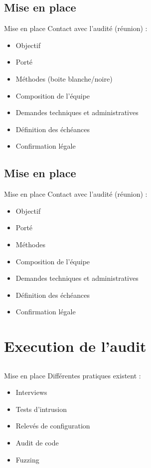 \documentclass{beamer}
\newcommand{\colorized}[1]{{\color{red}{#1}}}
\begin{document}
	\subsection{Mise en place}
	\begin{frame}{Mise en place}
	     Contact avec l'audité (réunion) : 
		\begin{itemize}
			\item Objectif
			\item Porté
			\item Méthodes (boite blanche/noire)
			\item Composition de l'équipe
			\item Demandes techniques et administratives
			\item Définition des échéances
			\item Confirmation légale
		\end{itemize}		
	\end{frame}

	\subsection{Mise en place}
		\begin{frame}{Mise en place}
		Contact avec l'audité (réunion) : 
		\begin{itemize}
			\item Objectif \colorized{Connaitre le failles pour pouvoir les corriger}
			\item Porté \colorized{Application web / OWASP Top 10}
			\item Méthodes \colorized{Boite blanche}
			\item Composition de l'équipe
			\item Demandes techniques et administratives \colorized{code source}
			\item Définition des échéances \colorized{\today}
			\item Confirmation légale
		\end{itemize}		
	\end{frame}


\section{Execution de l'audit}	
	\subsection{}
		\begin{frame}{Mise en place}
			Différentes pratiques existent : 
			\begin{itemize}
				\item Interviews 
				\item Tests d'intrusion
				\item Relevés de configuration
				\item Audit de code
				\item Fuzzing				
			\end{itemize}		
		\end{frame}
\end{document}
